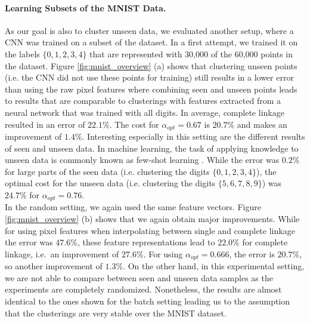 \paragraph{Learning Subsets of the MNIST Data.} As our goal is also to cluster unseen data, we evaluated another setup, where a CNN was trained on a subset of the dataset. In a first attempt, we trained it on the labels $\{0,1,2,3,4\}$ that are represented with 30,000 of the 60,000 points in the dataset. Figure \ref{fig:mnist_overview} (a) shows that clustering unseen points (i.e. the CNN did not use these points for training) still results in a lower error than using the raw pixel features where combining seen and unseen points leads to results that are comparable to clusterings with features extracted from a neural network that was trained with all digits. In average, complete linkage resulted in an error of $22.1\%$. The cost for $\alpha_{opt} = 0.67$ is $20.7\%$ and makes an improvement of $1.4\%$. Interesting especially in this setting are the different results of seen and unseen data. In machine learning, the task of applying knowledge to unseen data is commonly known as few-shot learning \cite{ren2018meta}. While the error was $0.2\%$ for large parts of the seen data (i.e. clustering the digits $\{0,1,2,3,4\}$), the optimal cost for the unseen data (i.e. clustering the digits $\{5,6,7,8,9\}$) was $24.7\%$ for $\alpha_{opt} = 0.76$.\\

In the random setting, we again used the same feature vectors. Figure \ref{fig:mnist_overview} (b) shows that we again obtain major improvements. While for using pixel features when interpolating between single and complete linkage the error was $47.6\%$, these feature representations lead to $22.0\%$ for complete linkage, i.e.\ an improvement of $27.6\%$. For using $\alpha_{opt} = 0.666$, the error is $20.7\%$, so another improvement of $1.3\%$. On the other hand, in this experimental setting, we are not able to compare between seen and unseen data samples as the experiments are completely randomized. Nonetheless, the results are almost identical to the ones shown for the batch setting leading us to the assumption that the clusterings are very stable over the MNIST dataset.

